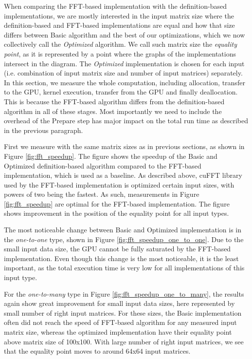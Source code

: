 When comparing the FFT-based implementation with the definition-based implementations, we are mostly interested in the input matrix size where the definition-based and FFT-based implementations are equal and how that size differs between Basic algorithm and the best of our optimizations, which we now collectively call the \textit{Optimized} algorithm. We call such matrix size the \textit{equality point}, as it is represented by a point where the graphs of the implementations intersect in the diagram. The \textit{Optimized} implementation is chosen for each input (i.e. combination of input matrix size and number of input matrices) separately. In this section, we measure the whole computation, including allocation, transfer to the GPU, kernel execution, transfer from the GPU and finally deallocation. This is because the FFT-based algorithm differs from the definition-based algorithm in all of these stages. Most importantly we need to include the overhead of the Prepare step has major impact on the total run time as described in the previous paragraph.

First we measure with the same matrix sizes as in previous sections, as shown in Figure \ref{fig:fft_speedup}. The figure shows the speedup of the Basic and Optimized definition-based algorithm compared to the FFT-based implementation, which is used as a baseline. As described above, cuFFT library used by the FFT-based implementation is optimized certain input sizes, with powers of two being the fastest. As such, measurements in Figure \ref{fig:fft_speedup} are optimal for the FFT-based implementation. The figure shows improvement in the position of the equality point for all input types.



The most noticeable change between Basic and Optimized implementation is in the \textit{one-to-one} type, shown in Figure \ref{fig:fft_speedup_one_to_one}. Due to the small input data size, the GPU cannot be fully saturated by the FFT-based implementation. Even though this change is the most noticeable, it is the least important, as the total execution time is very low for all implementations of this input type. 

For the \textit{one-to-many} type in Figure \ref{fig:fft_speedup_one_to_many}, the results again show great improvement for small input data sizes, here represented by small number of right input matrices. For these sizes, the Basic implementation often did not reach the speed of FFT-based algorithm for any measured input matrix size, whereas the optimized implementation have their equality point above matrix size of 100x100. With large number of right input matrices, we see that the equality point moves to around 64x64 input matrices.

